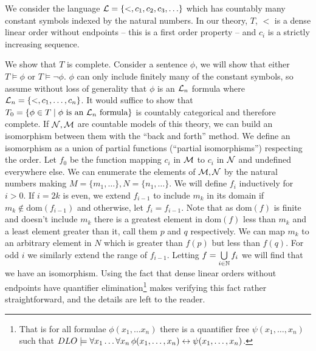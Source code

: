 \begin{example}\label{example_categoricity_sequence}
We consider the language \(\mathcal{L} = \{<, c_1, c_2, c_3, \ldots\}\) which has countably many constant symbols indexed by the natural numbers. 
In our theory, \(T\), \(<\) is a dense linear order without endpoints -- this is a first order property -- and \(c_i\) is a strictly increasing sequence. 

We show that \(T\) is complete.
Consider a sentence \(\phi\), we will show that either \(T \models \phi\) or \(T \models \neg \phi\). 
\(\phi\) can only include finitely many of the constant symbols, so assume without loss of generality that \(\phi\) is an \(\mathcal{L}_n\) formula where \(\mathcal{L}_n = \{<, c_1, \ldots, c_n\}\).
It would suffice to show that \(T_0 = \{\phi \in T \mid \phi \text{ is an } \mathcal{L}_n \text{ formula}\}\) is countably categorical and therefore complete. 
If \(\mathcal{N}, \mathcal{M}\) are countable models of this theory, we can build an isomorphism between them with the ``back and forth'' method. 
We define an isomorphism as a union of partial functions (``partial isomorphisms'') respecting the order. 
Let \(f_0\) be the function mapping \(c_i\) in \(\mathcal{M}\) to \(c_i\) in \(\mathcal{N}\) and undefined everywhere else. 
We can enumerate the elements of \(\mathcal{M}, \mathcal{N}\) by the natural numbers making \(M = \{m_1, \ldots\}, N = \{n_1, \ldots\}\). 
We will define \(f_i\) inductively for \(i > 0\). 
If \(i=2k\) is even, we extend \(f_{i-1}\) to include \(m_{k}\) in its domain if \(m_{k} \notin \text{dom}(f_{i-1})\) and otherwise, let \(f_i = f_{i-1}\).
Note that as \(\text{dom}(f)\) is finite and doesn't include \(m_{k}\) there is a greatest element in \(\text{dom}(f)\) less than \(m_{k}\) and a least element greater than it, call them \(p\) and \(q\) respectively.
We can map \(m_{k}\) to an arbitrary element in \(N\) which is greater than \(f(p)\) but less than \(f(q)\). 
For odd \(i\) we similarly extend the range of \(f_{i-1}\). 
Letting \(f = \bigcup\limits_{i \in \mathbb{N}}f_i\) we will find that we have an isomorphism. 
Using the fact that dense linear orders without endpoints have quantifier elimination\footnote{That is for all formulae \(\phi(x_1, \ldots x_n)\) there is a quantifier free \(\psi(x_1, \ldots, x_n)\) such that \(DLO \models \forall x_1 \ldots \forall x_n \, \phi(x_1, \ldots, x_n) \leftrightarrow \psi(x_1, \ldots, x_n)\).} \cite{mar} makes verifying this fact rather straightforward, and the details are left to the reader.
 

\end{example}
